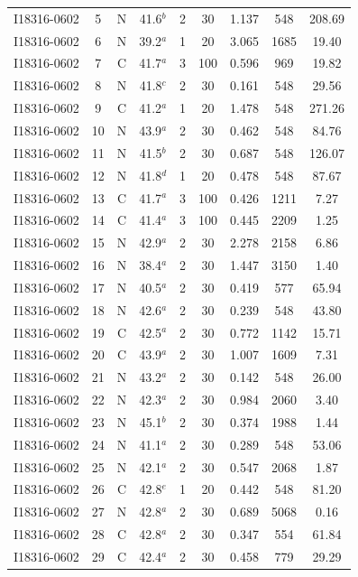 \begin{table}
\begin{tabular}{ccccccccc}
I18316-0602 & 5 & N & 41.6$^{b}$ & 2 & 30 & 1.137 & 548 & 208.69 \\
I18316-0602 & 6 & N & 39.2$^{a}$ & 1 & 20 & 3.065 & 1685 & 19.40 \\
I18316-0602 & 7 & C & 41.7$^{a}$ & 3 & 100 & 0.596 & 969 & 19.82 \\
I18316-0602 & 8 & N & 41.8$^{c}$ & 2 & 30 & 0.161 & 548 & 29.56 \\
I18316-0602 & 9 & C & 41.2$^{a}$ & 1 & 20 & 1.478 & 548 & 271.26 \\
I18316-0602 & 10 & N & 43.9$^{a}$ & 2 & 30 & 0.462 & 548 & 84.76 \\
I18316-0602 & 11 & N & 41.5$^{b}$ & 2 & 30 & 0.687 & 548 & 126.07 \\
I18316-0602 & 12 & N & 41.8$^{d}$ & 1 & 20 & 0.478 & 548 & 87.67 \\
I18316-0602 & 13 & C & 41.7$^{a}$ & 3 & 100 & 0.426 & 1211 & 7.27 \\
I18316-0602 & 14 & C & 41.4$^{a}$ & 3 & 100 & 0.445 & 2209 & 1.25 \\
I18316-0602 & 15 & N & 42.9$^{a}$ & 2 & 30 & 2.278 & 2158 & 6.86 \\
I18316-0602 & 16 & N & 38.4$^{a}$ & 2 & 30 & 1.447 & 3150 & 1.40 \\
I18316-0602 & 17 & N & 40.5$^{a}$ & 2 & 30 & 0.419 & 577 & 65.94 \\
I18316-0602 & 18 & N & 42.6$^{a}$ & 2 & 30 & 0.239 & 548 & 43.80 \\
I18316-0602 & 19 & C & 42.5$^{a}$ & 2 & 30 & 0.772 & 1142 & 15.71 \\
I18316-0602 & 20 & C & 43.9$^{a}$ & 2 & 30 & 1.007 & 1609 & 7.31 \\
I18316-0602 & 21 & N & 43.2$^{a}$ & 2 & 30 & 0.142 & 548 & 26.00 \\
I18316-0602 & 22 & N & 42.3$^{a}$ & 2 & 30 & 0.984 & 2060 & 3.40 \\
I18316-0602 & 23 & N & 45.1$^{b}$ & 2 & 30 & 0.374 & 1988 & 1.44 \\
I18316-0602 & 24 & N & 41.1$^{a}$ & 2 & 30 & 0.289 & 548 & 53.06 \\
I18316-0602 & 25 & N & 42.1$^{a}$ & 2 & 30 & 0.547 & 2068 & 1.87 \\
I18316-0602 & 26 & C & 42.8$^{e}$ & 1 & 20 & 0.442 & 548 & 81.20 \\
I18316-0602 & 27 & N & 42.8$^{a}$ & 2 & 30 & 0.689 & 5068 & 0.16 \\
I18316-0602 & 28 & C & 42.8$^{a}$ & 2 & 30 & 0.347 & 554 & 61.84 \\
I18316-0602 & 29 & C & 42.4$^{a}$ & 2 & 30 & 0.458 & 779 & 29.29 \\

\end{tabular}
\end{table}
